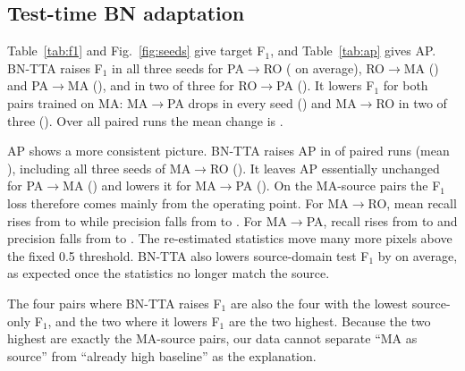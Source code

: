 \documentclass[11pt]{article}
\newcommand{\BNTTA}{BN-TTA}
\newcommand{\Fone}{F$_1$}
\newcommand{\pr}[2]{#1$\to$#2}
\begin{document}
\subsection{Test-time BN adaptation}

Table~\ref{tab:f1} and Fig.~\ref{fig:seeds} give target \Fone{}, and Table~\ref{tab:ap} gives AP.
\BNTTA{} raises \Fone{} in all three seeds for \pr{PA}{RO} (\TTAPAROD{} on average), \pr{RO}{MA} (\TTAROMAD{}) and \pr{PA}{MA} (\TTAPAMAD{}), and in two of three for \pr{RO}{PA} (\TTAROPAD{}).
It lowers \Fone{} for both pairs trained on MA: \pr{MA}{PA} drops in every seed (\TTAMAPAD{}) and \pr{MA}{RO} in two of three (\TTAMAROD{}).
Over all \TTAAllN{} paired runs the mean change is \TTAAllD{}.

AP shows a more consistent picture.
\BNTTA{} raises AP in \TTAAPAllW{} of \TTAAPAllN{} paired runs (mean \TTAAPAllD{}), including all three seeds of \pr{MA}{RO} (\TTAAPMAROD{}).
It leaves AP essentially unchanged for \pr{PA}{MA} (\TTAAPPAMAD{}) and lowers it for \pr{MA}{PA} (\TTAAPMAPAD{}).
On the MA-source pairs the \Fone{} loss therefore comes mainly from the operating point.
For \pr{MA}{RO}, mean recall rises from \SORMAROM{} to \TTARMAROM{} while precision falls from \SOPMAROM{} to \TTAPMAROM{}.
For \pr{MA}{PA}, recall rises from \SORMAPAM{} to \TTARMAPAM{} and precision falls from \SOPMAPAM{} to \TTAPMAPAM{}.
The re-estimated statistics move many more pixels above the fixed 0.5 threshold.
\BNTTA{} also lowers source-domain test \Fone{} by \TTASrcDropMean{} on average, as expected once the statistics no longer match the source.

The four pairs where \BNTTA{} raises \Fone{} are also the four with the lowest source-only \Fone{}, and the two where it lowers \Fone{} are the two highest.
Because the two highest are exactly the MA-source pairs, our data cannot separate ``MA as source'' from ``already high baseline'' as the explanation.

\begin{table}[htbp]
\centering
\caption{Target-domain test \Fone{} (mean $\pm$ std over seeds 42, 123, 456). In parentheses: number of seeds in which the method beats source-only with the same seed. Bold: best mean per pair.}
\label{tab:f1}
\resizebox{\textwidth}{!}{}
\end{table}

\begin{table}[htbp]
\centering
\caption{Target-domain test average precision (AP), same layout as Table~\ref{tab:f1}.}
\label{tab:ap}
\resizebox{\textwidth}{!}{}
\end{table}
\end{document}
